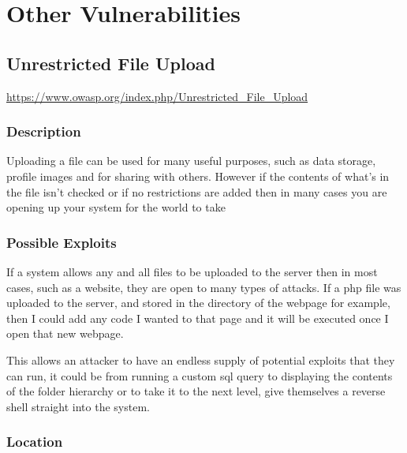 \documentclass[titlepage]{article}
\begin{document}
\section{Other Vulnerabilities} %
\label{sec:other_vulnerabilities}

   \subsection{Unrestricted File Upload} %
   \label{sub:unrestricted_file_upload}

      \url{https://www.owasp.org/index.php/Unrestricted_File_Upload}
   
      \subsubsection{Description} %
      \label{ssub:unrestricted_file_upload_description}
      
      Uploading a file can be used for many useful purposes, such as data storage, profile images and for sharing with others. However if the contents of what's in the file isn't checked or if no restrictions are added then in many cases you are opening up your system for the world to take


      \subsubsection{Possible Exploits} %
      \label{ssub:unrestricted_file_upload_possible_exploits}
      
      If a system allows any and all files to be uploaded to the server then in most cases, such as a website, they are open to many types of attacks. If a php file was uploaded to the server, and stored in the directory of the webpage for example, then I could add any code I wanted to that page and it will be executed once I open that new webpage.

      This allows an attacker to have an endless supply of potential exploits that they can run, it could be from running a custom sql query to displaying the contents of the folder hierarchy or to take it to the next level, give themselves a reverse shell straight into the system.


      \subsubsection{Location} %
      \label{ssub:unrestricted_file_upload_location}
      
\end{document}
